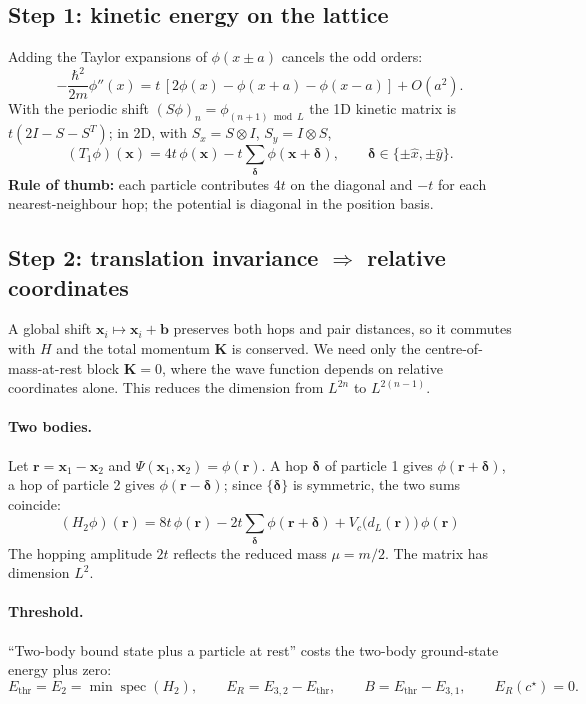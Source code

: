 \documentclass[11pt,a4paper]{article}
\newcommand{\rr}{\mathbf r}
\newcommand{\dd}{\boldsymbol\delta}
\newcommand{\Ethr}{E_{\mathrm{thr}}}
\begin{document}
\subsection{Step 1: kinetic energy on the lattice}
Adding the Taylor expansions of $\phi(x\pm a)$ cancels the odd orders:
\begin{equation}
-\frac{\hbar^2}{2m}\phi''(x)=t\,[2\phi(x)-\phi(x+a)-\phi(x-a)]+O(a^2).
\end{equation}
With the periodic shift $(S\phi)_n=\phi_{(n+1)\bmod L}$ the 1D kinetic matrix is $t(2I-S-S^T)$; in 2D, with $S_x=S\otimes I$, $S_y=I\otimes S$,
\begin{equation}
(T_1\phi)(\mathbf x)=4t\,\phi(\mathbf x)-t\sum_{\dd}\phi(\mathbf x+\dd),\qquad \dd\in\{\pm\hat x,\pm\hat y\}.
\end{equation}
\textbf{Rule of thumb:} each particle contributes $4t$ on the diagonal and $-t$ for each nearest-neighbour hop; the potential is diagonal in the position basis.

\subsection{Step 2: translation invariance $\Rightarrow$ relative coordinates}
A global shift $\mathbf x_i\mapsto\mathbf x_i+\mathbf b$ preserves both hops and pair distances, so it commutes with $H$ and the total momentum $\mathbf K$ is conserved.
We need only the centre-of-mass-at-rest block $\mathbf K=0$, where the wave function depends on relative coordinates alone.
This reduces the dimension from $L^{2n}$ to $L^{2(n-1)}$.

\paragraph{Two bodies.} Let $\rr=\mathbf x_1-\mathbf x_2$ and $\Psi(\mathbf x_1,\mathbf x_2)=\phi(\rr)$.
A hop $\dd$ of particle 1 gives $\phi(\rr+\dd)$, a hop of particle 2 gives $\phi(\rr-\dd)$; since $\{\dd\}$ is symmetric, the two sums coincide:
\begin{equation}
\boxed{(H_2\phi)(\rr)=8t\,\phi(\rr)-2t\sum_{\dd}\phi(\rr+\dd)+V_c\big(d_L(\rr)\big)\,\phi(\rr)}
\label{eq:h2}
\end{equation}
The hopping amplitude $2t$ reflects the reduced mass $\mu=m/2$. The matrix has dimension $L^2$.

\paragraph{Threshold.} ``Two-body bound state plus a particle at rest'' costs the two-body ground-state energy plus zero:
\begin{equation}
\Ethr=E_2=\min\operatorname{spec}(H_2),\qquad
E_R=E_{3,2}-\Ethr,\qquad B=\Ethr-E_{3,1},\qquad E_R(c^\star)=0.
\end{equation}
\end{document}

